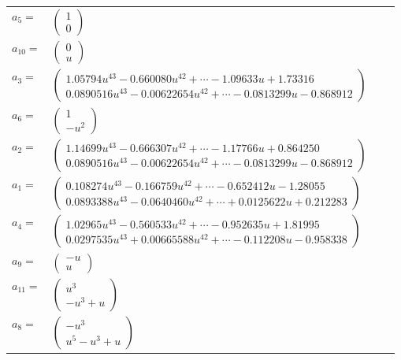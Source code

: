 \documentclass[1p]{elsarticle_modified}
\theoremstyle{definition}
\begin{document}
\begin{tabular}{m{7pt} m{180pt} m{7pt} m{180pt} }
\flushright $a_{5}=$&$\begin{pmatrix}1\\0\end{pmatrix}$ \\
\flushright $a_{10}=$&$\begin{pmatrix}0\\u\end{pmatrix}$ \\
\flushright $a_{3}=$&$\begin{pmatrix}1.05794 u^{43}-0.660080 u^{42}+\cdots-1.09633 u+1.73316\\0.0890516 u^{43}-0.00622654 u^{42}+\cdots-0.0813299 u-0.868912\end{pmatrix}$ \\
\flushright $a_{6}=$&$\begin{pmatrix}1\\- u^2\end{pmatrix}$ \\
\flushright $a_{2}=$&$\begin{pmatrix}1.14699 u^{43}-0.666307 u^{42}+\cdots-1.17766 u+0.864250\\0.0890516 u^{43}-0.00622654 u^{42}+\cdots-0.0813299 u-0.868912\end{pmatrix}$ \\
\flushright $a_{1}=$&$\begin{pmatrix}0.108274 u^{43}-0.166759 u^{42}+\cdots-0.652412 u-1.28055\\0.0893388 u^{43}-0.0640460 u^{42}+\cdots+0.0125622 u+0.212283\end{pmatrix}$ \\
\flushright $a_{4}=$&$\begin{pmatrix}1.02965 u^{43}-0.560533 u^{42}+\cdots-0.952635 u+1.81995\\0.0297535 u^{43}+0.00665588 u^{42}+\cdots-0.112208 u-0.958338\end{pmatrix}$ \\
\flushright $a_{9}=$&$\begin{pmatrix}- u\\u\end{pmatrix}$ \\
\flushright $a_{11}=$&$\begin{pmatrix}u^3\\- u^3+u\end{pmatrix}$ \\
\flushright $a_{8}=$&$\begin{pmatrix}- u^3\\u^5- u^3+u\end{pmatrix}$ \\

\end{tabular}
\end{document}
